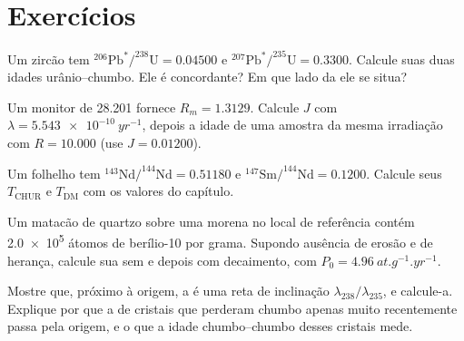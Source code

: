 \section{Exercícios}

\begin{exercise}[$\star$]\label{exo:b3:advanced-geochronology:1}
Um zircão tem $^{206}\mathrm{Pb}^*/^{238}\mathrm{U} = 0.04500$ e
$^{207}\mathrm{Pb}^*/^{235}\mathrm{U} = 0.3300$. Calcule suas duas
idades urânio--chumbo. Ele é concordante? Em que lado da  ele
se situa?
\end{exercise}

\begin{exercise}[$\star$]\label{exo:b3:advanced-geochronology:2}
Um monitor de \qty{28.201}{\Ma} fornece $R_m = 1.3129$. Calcule $J$ com $\lambda
= \qty{5.543e-10}{yr^{-1}}$, depois a idade de uma amostra da mesma irradiação
com $R = 10.000$ (use $J = 0.01200$).
\end{exercise}

\begin{exercise}[$\star$]\label{exo:b3:advanced-geochronology:3}
Um folhelho tem $^{143}\mathrm{Nd}/^{144}\mathrm{Nd} = 0.51180$ e
$^{147}\mathrm{Sm}/^{144}\mathrm{Nd} = 0.1200$. Calcule seus $T_{\mathrm{CHUR}}$
e $T_{\mathrm{DM}}$ com os valores do capítulo.
\end{exercise}

\begin{exercise}[$\star$]\label{exo:b3:advanced-geochronology:4}
Um matacão de quartzo sobre uma morena no local de referência contém \num{2.0e5}
átomos de berílio-10 por grama. Supondo ausência de erosão e de herança,
calcule sua  sem e depois com decaimento, com $P_0 =
\qty{4.96}{at.g^{-1}.yr^{-1}}$.
\end{exercise}

\begin{exercise}[$\star\star$]\label{exo:b3:advanced-geochronology:5}
Mostre que, próximo à origem, a  é uma reta de inclinação
$\lambda_{238}/\lambda_{235}$, e calcule-a. Explique por que a  de
cristais que perderam chumbo apenas muito recentemente passa pela origem, e
o que a idade chumbo--chumbo desses cristais mede.
\end{exercise}

